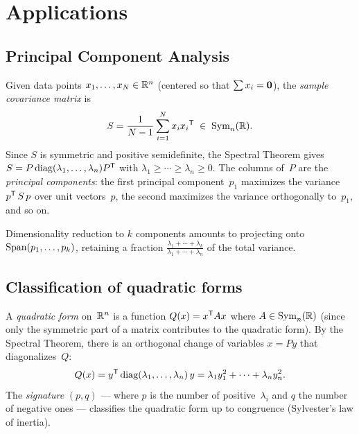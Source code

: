 \section{Applications}\label{sec:spectral-applications}

\subsection{Principal Component Analysis}\label{subsec:pca}

Given data points $x_1,\ldots,x_N\in{\mathbb{R}}^n$ (centered so that
$\sum x_i = \mathbf{0}$), the \emph{sample covariance matrix} is
\[
  S = \frac{1}{N-1}\sum_{i=1}^{N} x_i{x_i}^{\mathsf{T}}
  \;\in\;\operatorname{Sym}_n({\mathbb{R}}).
\]
Since $S$ is symmetric and positive semidefinite, the Spectral Theorem
gives $S = P\operatorname{diag}(\lambda_1,\ldots,\lambda_n){P}^{\mathsf{T}}$ with
$\lambda_1\geq\cdots\geq\lambda_n\geq 0$.  The columns of~$P$ are the
\emph{principal components}: the first principal component~$p_1$
maximizes the variance ${p}^{\mathsf{T}}\,S\,p$ over unit vectors~$p$,
the second maximizes the variance orthogonally to~$p_1$, and so on.

Dimensionality reduction to $k$ components amounts to projecting onto
$\operatorname{Span}(p_1,\ldots,p_k)$, retaining a fraction
$\frac{\lambda_1+\cdots+\lambda_k}{\lambda_1+\cdots+\lambda_n}$
of the total variance.

\subsection{Classification of quadratic forms}%
\label{subsec:quadratic-forms}

A \emph{quadratic form} on~${\mathbb{R}}^n$ is a function
$Q(x) = {x}^{\mathsf{T}}Ax$ where $A\in\operatorname{Sym}_n({\mathbb{R}})$ (since only the
symmetric part of a matrix contributes to the quadratic form).
By the Spectral Theorem, there is an orthogonal change of variables
$x = Py$ that diagonalizes~$Q$:
\[
  Q(x) = {y}^{\mathsf{T}}\operatorname{diag}(\lambda_1,\ldots,\lambda_n)\,y
  = \lambda_1 y_1^2 + \cdots + \lambda_n y_n^2.
\]
The \emph{signature} $(p,q)$ ---
where $p$ is the number of positive~$\lambda_i$ and $q$ the number of
negative ones --- classifies the quadratic form up to congruence
(Sylvester's law of inertia).

